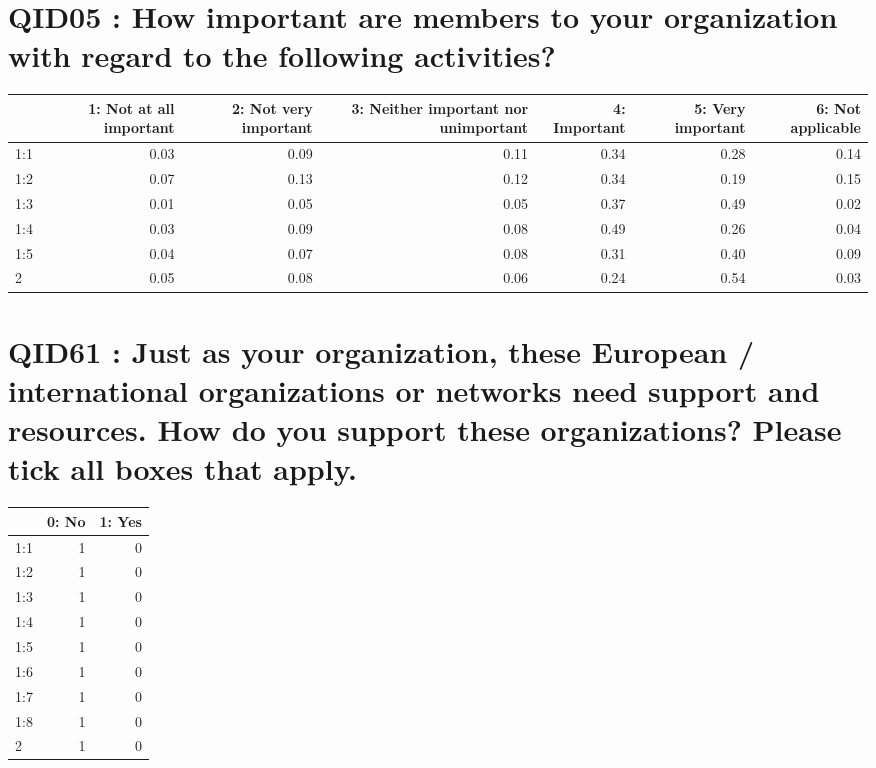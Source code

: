 \documentclass[]{article}
\begin{document}
\section{QID05 : How important are members to your organization with
regard to the following
activities?}\label{qid05-how-important-are-members-to-your-organization-with-regard-to-the-following-activities}

\begin{table}[H]
\centering\begingroup\fontsize{30}{32}\selectfont

\begin{tabular}{l|r|r|r|r|r|r}
\hline
  & 1: Not at all important &  2: Not very important &  3: Neither important nor unimportant &  4: Important &  5: Very important &  6: Not applicable\\
\hline
1:1 & 0.03 & 0.09 & 0.11 & 0.34 & 0.28 & 0.14\\
\hline
1:2 & 0.07 & 0.13 & 0.12 & 0.34 & 0.19 & 0.15\\
\hline
1:3 & 0.01 & 0.05 & 0.05 & 0.37 & 0.49 & 0.02\\
\hline
1:4 & 0.03 & 0.09 & 0.08 & 0.49 & 0.26 & 0.04\\
\hline
1:5 & 0.04 & 0.07 & 0.08 & 0.31 & 0.40 & 0.09\\
\hline
2 & 0.05 & 0.08 & 0.06 & 0.24 & 0.54 & 0.03\\
\hline
\end{tabular}
\endgroup{}
\end{table}

\section{QID61 : Just as your organization, these European /
international organizations or networks need support and resources. How
do you support these organizations? Please tick all boxes that
apply.}\label{qid61-just-as-your-organization-these-european-international-organizations-or-networks-need-support-and-resources.-how-do-you-support-these-organizations-please-tick-all-boxes-that-apply.}

\begin{table}[H]
\centering\begingroup\fontsize{30}{32}\selectfont

\begin{tabular}{l|r|r}
\hline
  & 0: No &  1: Yes\\
\hline
1:1 & 1 & 0\\
\hline
1:2 & 1 & 0\\
\hline
1:3 & 1 & 0\\
\hline
1:4 & 1 & 0\\
\hline
1:5 & 1 & 0\\
\hline
1:6 & 1 & 0\\
\hline
1:7 & 1 & 0\\
\hline
1:8 & 1 & 0\\
\hline
2 & 1 & 0\\
\hline
\end{tabular}
\endgroup{}
\end{table}
\end{document}
